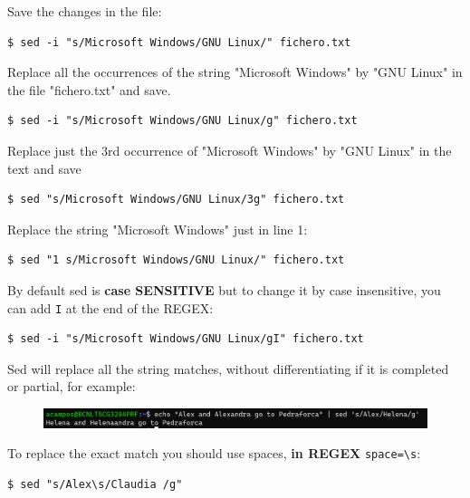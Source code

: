 \documentclass{article}
\newenvironment{blocktemplate}[1]{%
    \tcolorbox[beamer,%
    noparskip,breakable,
    colframe=Blue,%
    colbacklower=LimeGreen!75!LightGreen,%
    title=#1]}%
    {\endtcolorbox}
\newenvironment{blocktemplateIII}[1]{%
    \tcolorbox[beamer,%
    noparskip,breakable,
    ,colframe=Red,%
    colbacklower=LimeGreen!75!LightGreen,%
    title=#1]}%
    {\endtcolorbox}
\newenvironment{codetemplate}[1][]{%
  \mybasecolorbox[#1]
  \itshape
}{%
  \endmybasecolorbox
}
\begin{document}
Save the changes in the file:
\begin{codetemplate}{}
\begin{verbatim}
$ sed -i "s/Microsoft Windows/GNU Linux/" fichero.txt
\end{verbatim}
\end{codetemplate}

 Replace all the occurrences of the string "Microsoft Windows" by "GNU Linux" in the file "fichero.txt" and save.
 \begin{codetemplate}{}
\begin{verbatim}
$ sed -i "s/Microsoft Windows/GNU Linux/g" fichero.txt
\end{verbatim}
\end{codetemplate}

 Replace just the 3rd occurrence of "Microsoft Windows" by "GNU Linux" in the text and save
\begin{codetemplate}{}
\begin{verbatim}
$ sed "s/Microsoft Windows/GNU Linux/3g" fichero.txt
\end{verbatim}
\end{codetemplate}

Replace the string "Microsoft Windows" just in line 1:
\begin{codetemplate}{}
\begin{verbatim}
$ sed "1 s/Microsoft Windows/GNU Linux/" fichero.txt
\end{verbatim}
\end{codetemplate}

\begin{blocktemplate}{NOTE}
By default sed is \textbf{case SENSITIVE} but to change it by case insensitive, you can add \verb|I| at the end of the REGEX:
 \begin{codetemplate}{}
\begin{verbatim}
$ sed -i "s/Microsoft Windows/GNU Linux/gI" fichero.txt
\end{verbatim}
\end{codetemplate}
\end{blocktemplate}

\begin{blocktemplateIII}{WARNING}
Sed will replace all the string matches, without differentiating if it is completed or partial, for example:
\begin{figure}[H]
    \includegraphics[width=\textwidth]{pictures/sed.png}
    \centering
\end{figure}

To replace the exact match you should use spaces, \textbf{in REGEX} \verb|space=\s|:
\begin{codetemplate}{}
\begin{verbatim}
$ sed "s/Alex\s/Claudia /g"
\end{verbatim}
\end{codetemplate}
\end{blocktemplateIII}
\end{document}
